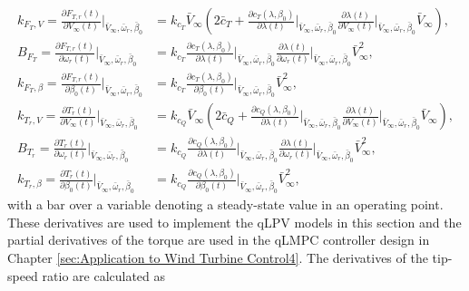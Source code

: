 \begin{align*}
     k_{F_T,V} = \frac{\partial F_{T,r}(t)}{\partial{V_{\infty}(t)}} \bigg|_{\bar{V}_{\infty},\bar{\omega}_r,\bar{\beta}_0} &= k_{c_T}  \bar{V}_{\infty} \left(2\bar{c}_T + \frac{\partial  c_T(\lambda,\beta_0)}{\partial{\lambda(t)}}\bigg|_{\bar{V}_{\infty},\bar{\omega}_r,\bar{\beta}_0}  \frac{ \partial \lambda(t)}{ \partial V_{\infty}(t)}\bigg|_{\bar{V}_{\infty},\bar{\omega}_r,\bar{\beta}_0} \bar{V}_{\infty} \right),\\
    B_{F_T} = \frac{\partial F_{T,r}(t)}{\partial{\omega_r(t) }}  \bigg|_{\bar{V}_{\infty},\bar{\omega}_r,\bar{\beta}_0} &= 
    k_{c_T} \frac{\partial c_{T}(\lambda,\beta_0)}{\partial \lambda(t)} \bigg|_{\bar{V}_{\infty},\bar{\omega}_r,\bar{\beta}_0} \frac{ \partial \lambda(t)}{ \partial \omega_r(t)}\bigg|_{\bar{V}_{\infty},\bar{\omega}_r,\bar{\beta}_0} \bar{V}_{\infty}^2, \\
   k_{F_T,\beta} = \frac{\partial F_{T,r}(t)}{\partial{\beta_0(t) }}  \bigg|_{\bar{V}_{\infty},\bar{\omega}_r,\bar{\beta}_0} &= 
k_{c_T} \frac{\partial c_{T}(\lambda,\beta_0)}{\partial \beta_0(t)} \bigg|_{\bar{V}_{\infty},\bar{\omega}_r,\bar{\beta}_0} \bar{V}_{\infty}^2, \\
     k_{T_r,V} = \frac{\partial T_{r}(t)}{\partial{V_{\infty}(t)}} \bigg|_{\bar{V}_{\infty},\bar{\omega}_r,\bar{\beta}_0} &= k_{c_Q}  \bar{V}_{\infty} \left(2\bar{c}_Q + \frac{\partial  c_Q(\lambda,\beta_0)}{\partial{\lambda(t)}}\bigg|_{\bar{V}_{\infty},\bar{\omega}_r,\bar{\beta}_0}  \frac{ \partial \lambda(t)}{ \partial V_{\infty}(t)}\bigg|_{\bar{V}_{\infty},\bar{\omega}_r,\bar{\beta}_0} \bar{V}_{\infty} \right),\\
    B_{T_r} = \frac{\partial T_{r}(t)}{\partial{\omega_r(t) }}  \bigg|_{\bar{V}_{\infty},\bar{\omega}_r,\bar{\beta}_0} &= 
    k_{c_Q} \frac{\partial c_{Q}(\lambda,\beta_0)}{\partial \lambda(t)} \bigg|_{\bar{V}_{\infty},\bar{\omega}_r,\bar{\beta}_0} \frac{ \partial \lambda(t)}{ \partial \omega_r(t)}\bigg|_{\bar{V}_{\infty},\bar{\omega}_r,\bar{\beta}_0} \bar{V}_{\infty}^2, \\
    k_{T_r,\beta} = \frac{\partial T_{r}(t)}{\partial{\beta_0(t) }}  \bigg|_{\bar{V}_{\infty},\bar{\omega}_r,\bar{\beta}_0} &= 
    k_{c_Q} \frac{\partial c_{Q}(\lambda,\beta_0)}{\partial \beta_0(t)} \bigg|_{\bar{V}_{\infty},\bar{\omega}_r,\bar{\beta}_0} \bar{V}_{\infty}^2, 
\end{align*}
with a bar over a variable denoting a steady-state value in an operating point.
These derivatives are used to implement the qLPV models in this section and the partial derivatives of the torque are used in the qLMPC controller design in Chapter \ref{sec:Application to Wind Turbine Control4}. The derivatives of the tip-speed ratio are calculated as
